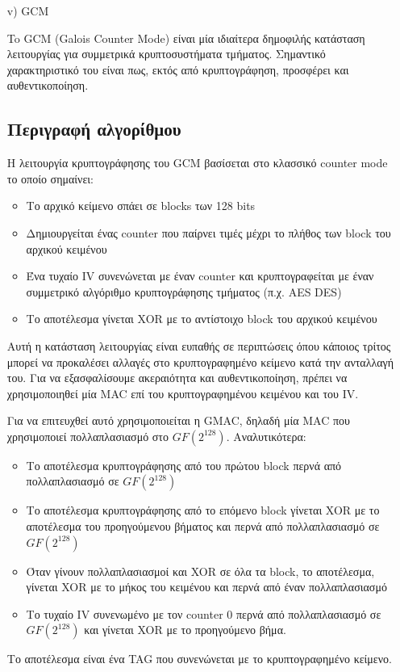 \documentclass[a4paper, 11pt]{article}
\newcommand{\lt}{\latintext}
\begin{document}
\begin{itemize}
	\item[{\lt v)}] {\lt GCM}

	To {\lt GCM (Galois Counter Mode)} είναι μία ιδιαίτερα δημοφιλής κατάσταση λειτουργίας για συμμετρικά κρυπτοσυστήματα τμήματος. Σημαντικό χαρακτηριστικό του είναι πως, εκτός από κρυπτογράφηση, προσφέρει και αυθεντικοποίηση. \\

	\subsection*{Περιγραφή αλγορίθμου}
	Η λειτουργία κρυπτογράφησης του {\lt GCM} βασίσεται στο κλασσικό {\lt counter mode} το οποίο σημαίνει:
	\begin{itemize}
		\item Το αρχικό κείμενο σπάει σε {\lt blocks} των 128 {\lt bits}
		\item Δημιουργείται ένας {\lt counter} που παίρνει τιμές μέχρι το πλήθος των {\lt block} του αρχικού κειμένου
		\item Ένα τυχαίο {\lt IV} συνενώνεται με έναν {\lt counter} και κρυπτογραφείται με έναν συμμετρικό αλγόριθμο κρυπτογράφησης τμήματος (π.χ. {\lt AES DES})
		\item Tο αποτέλεσμα γίνεται {\lt XOR} με το αντίστοιχο {\lt block} του αρχικού κειμένου
	\end{itemize}

	Αυτή η κατάσταση λειτουργίας είναι ευπαθής σε περιπτώσεις όπου κάποιος τρίτος μπορεί να προκαλέσει αλλαγές στο κρυπτογραφημένο κείμενο κατά την ανταλλαγή του. Για να εξασφαλίσουμε ακεραιότητα και αυθεντικοποίηση, πρέπει να χρησιμοποιηθεί μία {\lt MAC} επί του κρυπτογραφημένου κειμένου και του {\lt IV}.

	Για να επιτευχθεί αυτό χρησιμοποιείται η {\lt GMAC}, δηλαδή μία {\lt MAC} που χρησιμοποιεί πολλαπλασιασμό στο $GF(2^{128})$. Αναλυτικότερα:
	\begin{itemize}
		\item Το αποτέλεσμα κρυπτογράφησης από του πρώτου {\lt block} περνά από πολλαπλασιασμό σε $GF(2^{128})$
		\item Το αποτέλεσμα κρυπτογράφησης από το επόμενο {\lt block} γίνεται {\lt XOR} με το αποτέλεσμα του προηγούμενου βήματος και περνά από πολλαπλασιασμό σε $GF(2^{128})$
		\item Όταν γίνουν πολλαπλασιασμοί και {\lt XOR} σε όλα τα {\lt block}, το αποτέλεσμα, γίνεται {\lt XOR} με το μήκος του κειμένου και περνά από έναν πολλαπλασιασμό
		\item Το τυχαίο {\lt IV} συνενωμένο με τον {\lt counter 0} περνά από πολλαπλασιασμό σε $GF(2^{128})$ και γίνεται {\lt XOR} με το προηγούμενο βήμα.
	\end{itemize}
	Το αποτέλεσμα είναι ένα {\lt TAG} που συνενώνεται με το κρυπτογραφημένο κείμενο.


\end{itemize}
\end{document}
